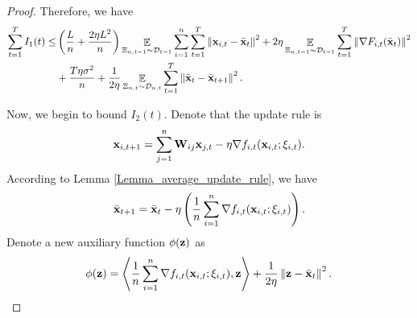 \documentclass{article}
\begin{document}
\begin{proof}
Therefore, we have 
\begin{align}
\nonumber
\sum_{t=1}^T I_1(t) \le &  \left(  \frac{L}{n} + \frac{2\eta L^2}{n}  \right)\mathop{\mathbb{E}}_{ \Xi_{n,t-1} \sim \mathcal{D}_{t-1} }\sum_{i=1}^n\sum_{t=1}^T\left\lVert{\bf x}_{i,t} - \bar{{\bf x}}_t \right\rVert^2   + 2\eta  \mathop{\mathbb{E}}_{ \Xi_{n,t-1} \sim \mathcal{D}_{t-1} }\sum_{t=1}^T\left\lVert\nabla F_{i,t}(\bar{{\bf x}}_t)\right\rVert^2 \\ \nonumber 
&+ \frac{T\eta  \sigma^2}{n} +  \frac{1}{2\eta} \mathop{\mathbb{E}}_{ \Xi_{n,t} \sim \mathcal{D}_{n,t} }\sum_{t=1}^T\left\lVert \bar{{\bf x}}_t - \bar{{\bf x}}_{t+1}\right\rVert^2.
\end{align} 




Now, we begin to bound $I_2(t)$. Denote that the update rule is 
\begin{align}
\nonumber
{\bf x}_{i,t+1} = \sum_{j=1}^n {\bf W}_{ij}{\bf x}_{j,t} - \eta \nabla f_{i,t}({\bf x}_{i,t};\xi_{i,t}).
\end{align}  According to Lemma \ref{Lemma_average_update_rule}, we have 
\begin{align}
\label{equa_thoerem_update_rule_equivalent}
\bar{{\bf x}}_{t+1} = \bar{{\bf x}}_t - \eta \left( \frac{1}{n}\sum_{i=1}^n \nabla f_{i,t}({\bf x}_{i,t};\xi_{i,t}) \right).
\end{align} 
Denote a new auxiliary function $\phi({\bf z})$ as 
\begin{align}
\nonumber
\phi({\bf z}) = \left\langle\frac{1}{n}\sum_{i=1}^n \nabla f_{i,t}({\bf x}_{i,t};\xi_{i,t}), {\bf z} \right\rangle + \frac{1}{2\eta}\left\lVert{\bf z} - \bar{{\bf x}}_t\right\rVert^2.
\end{align} 


\end{proof}
\end{document}
